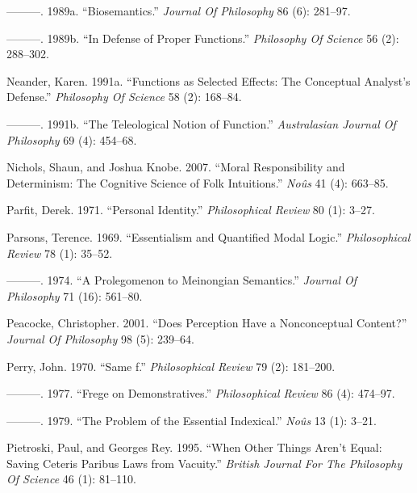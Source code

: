 \documentclass[
  10pt,
  letterpaper,
  DIV=11,
  numbers=noendperiod,
  twoside]{scrartcl}
\newlength{\cslhangindent}
\newenvironment{CSLReferences}[2] %
 {\begin{list}{}{%
  \setlength{\itemindent}{0pt}
  \setlength{\leftmargin}{0pt}
  \setlength{\parsep}{0pt}
  \ifodd #1
   \setlength{\leftmargin}{\cslhangindent}
   \setlength{\itemindent}{-1\cslhangindent}
  \fi
  \setlength{\itemsep}{#2\baselineskip}}}
 {\end{list}}
\begin{document}
\begin{CSLReferences}{1}{0}
---------. 1989a. {``Biosemantics.''} \emph{Journal Of Philosophy} 86
(6): 281--97.

---------. 1989b. {``In Defense of Proper Functions.''} \emph{Philosophy
Of Science} 56 (2): 288--302.

Neander, Karen. 1991a. {``Functions as Selected Effects: The Conceptual
Analyst's Defense.''} \emph{Philosophy Of Science} 58 (2): 168--84.

---------. 1991b. {``The Teleological Notion of Function.''}
\emph{Australasian Journal Of Philosophy} 69 (4): 454--68.

Nichols, Shaun, and Joshua Knobe. 2007. {``Moral Responsibility and
Determinism: The Cognitive Science of Folk Intuitions.''} \emph{Noûs} 41
(4): 663--85.

Parfit, Derek. 1971. {``Personal Identity.''} \emph{Philosophical
Review} 80 (1): 3--27.

Parsons, Terence. 1969. {``Essentialism and Quantified Modal Logic.''}
\emph{Philosophical Review} 78 (1): 35--52.

---------. 1974. {``A Prolegomenon to Meinongian Semantics.''}
\emph{Journal Of Philosophy} 71 (16): 561--80.

Peacocke, Christopher. 2001. {``Does Perception Have a Nonconceptual
Content?''} \emph{Journal Of Philosophy} 98 (5): 239--64.

Perry, John. 1970. {``Same f.''} \emph{Philosophical Review} 79 (2):
181--200.

---------. 1977. {``Frege on Demonstratives.''} \emph{Philosophical
Review} 86 (4): 474--97.

---------. 1979. {``The Problem of the Essential Indexical.''}
\emph{Noûs} 13 (1): 3--21.

Pietroski, Paul, and Georges Rey. 1995. {``When Other Things Aren't
Equal: Saving Ceteris Paribus Laws from Vacuity.''} \emph{British
Journal For The Philosophy Of Science} 46 (1): 81--110.


\end{CSLReferences}
\end{document}
